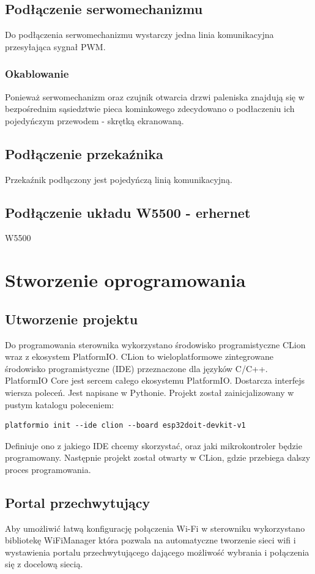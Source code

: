 \documentclass[12pt]{report}
\begin{document}
 \section{Podłączenie serwomechanizmu}
 Do podłączenia serwomechanizmu wystarczy jedna linia komunikacyjna przesyłająca sygnał PWM.
 \subsection{Okablowanie}
 Ponieważ serwomechanizm oraz czujnik otwarcia drzwi paleniska znajdują się w bezpośrednim sąsiedztwie pieca kominkowego zdecydowano o podłaczeniu ich pojedyńczym przewodem - skrętką ekranowaną.
 
 \section{Podłączenie przekaźnika}
 Przekaźnik podłączony jest pojedyńczą linią komunikacyjną.
 
  \section{Podłączenie układu W5500 - erhernet}
 W5500 
 
 \chapter{Stworzenie oprogramowania}\label{rozdz.stworzenie}
 
 \section{Utworzenie projektu}
 Do programowania sterownika wykorzystano środowisko programistyczne CLion wraz z ekosystem PlatformIO.
 CLion to wieloplatformowe zintegrowane środowisko programistyczne (IDE) przeznaczone dla języków C/C++.
 PlatformIO Core jest sercem całego ekosystemu PlatformIO. Dostarcza interfejs wiersza poleceń. Jest napisane w Pythonie.
 Projekt został zainicjalizowany w pustym katalogu poleceniem:
 \begin{lstlisting}
platformio init --ide clion --board esp32doit-devkit-v1 
 \end{lstlisting}
 Definiuje ono z jakiego IDE chcemy skorzystać, oraz jaki mikrokontroler będzie programowany.
 Następnie projekt został otwarty w CLion, gdzie przebiega dalszy proces programowania.
 
 \section{Portal przechwytujący}
 Aby umożliwić łatwą konfigurację połączenia Wi-Fi w sterowniku wykorzystano bibliotekę WiFiManager która pozwala na automatyczne tworzenie sieci wifi i wystawienia portalu przechwytującego dającego możliwość wybrania i połączenia się z docelową siecią. 
 
\end{document}
